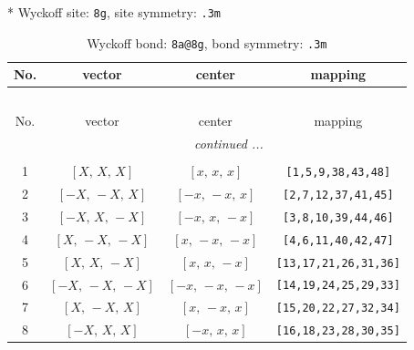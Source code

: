 \documentclass[fleqn,8pt]{jsarticle}
\begin{document}
* Wyckoff site: {\tt 8g}, site symmetry: {\tt .3m}
\renewcommand{\arraystretch}{1.2}
\begin{longtable}{cccc}
\caption{Wyckoff bond: {\tt 8a@8g}, bond symmetry: {\tt .3m}}
 \\
 \hline \hline
No. & vector & center & mapping \\ \hline \endfirsthead

\multicolumn{3}{l}{\tablename\ \thetable{}} \\
 \hline \hline
No. & vector & center & mapping \\ \hline \endhead

 \hline \hline
\multicolumn{3}{r}{\footnotesize\it continued ...} \\ \endfoot

 \hline \hline
\multicolumn{3}{r}{} \\ \endlastfoot

1 & $\left[ X,\, X,\, X \right]$ & $\left[ x,\, x,\, x \right]$ & {\tt [1,5,9,38,43,48]} \\ \hline
2 & $\left[ - X,\, - X,\, X \right]$ & $\left[ - x,\, - x,\, x \right]$ & {\tt [2,7,12,37,41,45]} \\ \hline
3 & $\left[ - X,\, X,\, - X \right]$ & $\left[ - x,\, x,\, - x \right]$ & {\tt [3,8,10,39,44,46]} \\ \hline
4 & $\left[ X,\, - X,\, - X \right]$ & $\left[ x,\, - x,\, - x \right]$ & {\tt [4,6,11,40,42,47]} \\ \hline
5 & $\left[ X,\, X,\, - X \right]$ & $\left[ x,\, x,\, - x \right]$ & {\tt [13,17,21,26,31,36]} \\ \hline
6 & $\left[ - X,\, - X,\, - X \right]$ & $\left[ - x,\, - x,\, - x \right]$ & {\tt [14,19,24,25,29,33]} \\ \hline
7 & $\left[ X,\, - X,\, X \right]$ & $\left[ x,\, - x,\, x \right]$ & {\tt [15,20,22,27,32,34]} \\ \hline
8 & $\left[ - X,\, X,\, X \right]$ & $\left[ - x,\, x,\, x \right]$ & {\tt [16,18,23,28,30,35]} \\
\end{longtable}
\renewcommand{\arraystretch}{1.2}
\end{document}
